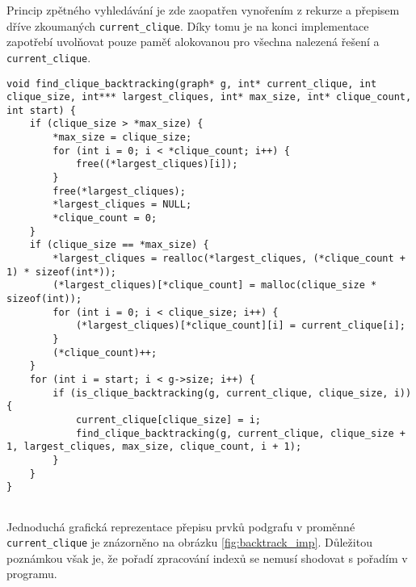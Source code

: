 \documentclass[a4paper]{article}
\begin{document}
        \noindent
        Princip zpětného vyhledávání je zde zaopatřen vynořením z rekurze a přepisem dříve zkoumaných \lstinline{current_clique}. Díky tomu je na konci implementace zapotřebí uvolňovat pouze paměť alokovanou pro všechna nalezená řešení a \lstinline{current_clique}.\\

         \begin{lstlisting}[caption={Zjednodušený kód pro rekurzivní funkci využitou při implementace metody zpětným vyhledáváním.}, captionpos=b]
void find_clique_backtracking(graph* g, int* current_clique, int clique_size, int*** largest_cliques, int* max_size, int* clique_count, int start) {
    if (clique_size > *max_size) {
        *max_size = clique_size;
        for (int i = 0; i < *clique_count; i++) {
            free((*largest_cliques)[i]);
        }
        free(*largest_cliques);
        *largest_cliques = NULL;
        *clique_count = 0;
    }
    if (clique_size == *max_size) {
        *largest_cliques = realloc(*largest_cliques, (*clique_count + 1) * sizeof(int*));
        (*largest_cliques)[*clique_count] = malloc(clique_size * sizeof(int));
        for (int i = 0; i < clique_size; i++) {  
            (*largest_cliques)[*clique_count][i] = current_clique[i];
        }
        (*clique_count)++; 
    }
    for (int i = start; i < g->size; i++) {
        if (is_clique_backtracking(g, current_clique, clique_size, i)) {
            current_clique[clique_size] = i;
            find_clique_backtracking(g, current_clique, clique_size + 1, largest_cliques, max_size, clique_count, i + 1);
        }
    }
}
        
         \end{lstlisting}

         \noindent
         Jednoduchá grafická reprezentace přepisu prvků podgrafu v proměnné \lstinline{current_clique} je znázorněno na obrázku \ref{fig:backtrack_imp}. Důležitou poznámkou však je, že pořadí zpracování indexů se nemusí shodovat s pořadím v programu.
\end{document}
